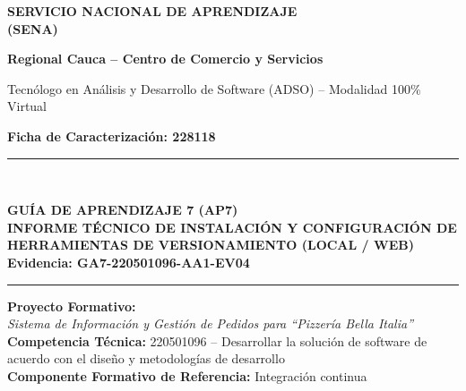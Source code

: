 \documentclass[11pt,a4paper]{article}
\begin{document}
\begin{titlepage}
    \centering
    \vspace*{0.5cm}
    
    {\Huge\bfseries\color{senaGreen} SERVICIO NACIONAL DE APRENDIZAJE\\[0.2cm] (SENA)\par}
    \vspace{0.4cm}
    {\large\textbf{\color{senaDark} Regional Cauca -- Centro de Comercio y Servicios}\par}
    \vspace{0.2cm}
    {\normalsize Tecnólogo en Análisis y Desarrollo de Software (ADSO) -- Modalidad 100\% Virtual\par}
    \vspace{0.1cm}
    {\normalsize\textbf{Ficha de Caracterización: 228118}\par}
    
    \vspace{1.2cm}
    \rule{\linewidth}{1.5pt}\\[0.4cm]
    {\LARGE\bfseries\color{senaDark} GUÍA DE APRENDIZAJE 7 (AP7)\\[0.25cm]
    \Large INFORME TÉCNICO DE INSTALACIÓN Y CONFIGURACIÓN DE HERRAMIENTAS DE VERSIONAMIENTO (LOCAL / WEB)\\[0.3cm]
    \large\color{techBlue} Evidencia: GA7-220501096-AA1-EV04\par}
    \rule{\linewidth}{1.5pt}
    
    \vspace{1.5cm}
    
    \begin{tcolorbox}[colback=senaLight,colframe=senaGreen,arc=3mm,width=0.92\linewidth]
        \centering
        \textbf{\large Proyecto Formativo:}\\[0.15cm]
        \textit{Sistema de Información y Gestión de Pedidos para ``Pizzería Bella Italia''}\\[0.3cm]
        \textbf{Competencia Técnica:} 220501096 -- Desarrollar la solución de software de acuerdo con el diseño y metodologías de desarrollo\\[0.15cm]
        \textbf{Componente Formativo de Referencia:} Integración continua
    \end{tcolorbox}
    
    \vspace{1.8cm}
    

\end{titlepage}
\end{document}
